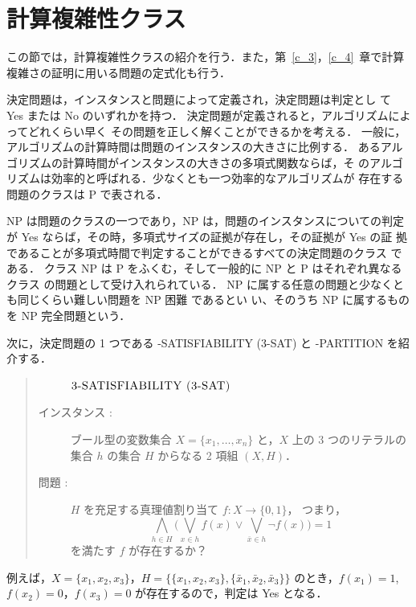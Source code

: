\documentclass[12pt]{optlab-bachelor}
\begin{document}
\section{計算複雑性クラス}
この節では，計算複雑性クラスの紹介を行う．また，第~\ref{c_3}，\ref{c_4}~章で計算複雑さの証明に用いる問題の定式化も行う．

決定問題は，インスタンスと問題によって定義され，決定問題は判定とし
て Yes または No のいずれかを持つ．
決定問題が定義されると，アルゴリズムによってどれくらい早く
その問題を正しく解くことができるかを考える．
一般に，アルゴリズムの計算時間は問題のインスタンスの大きさに比例する．
あるアルゴリズムの計算時間がインスタンスの大きさの多項式関数ならば，そ
のアルゴリズムは効率的と呼ばれる．少なくとも一つ効率的なアルゴリズムが
存在する問題のクラスは P で表される．

NP は問題のクラスの一つであり，NP は，問題のインスタンスについての判定
が Yes ならば，その時，多項式サイズの証拠が存在し，その証拠が Yes の証
拠であることが多項式時間で判定することができるすべての決定問題のクラス
である．
クラス NP は P をふくむ，そして一般的に NP と P はそれぞれ異なるクラス
の問題として受け入れられている．
NP に属する任意の問題と少なくとも同じくらい難しい問題を NP 困難 であるとい
い、そのうち NP に属するものを NP 完全問題という．

次に，決定問題の 1 つである {-SATISFIABILITY (3-SAT)} と {-PARTITION} を紹介する．

\begin{quote}
  \begin{description}
    \item[] ${\mbox {\bf {\sc 3-SATISFIABILITY (3-SAT)}}}$
    \item[インスタンス : ] ブール型の変数集合 $X = \{x_1,\ldots,x_n\}$ と，$X$ 上の 3 つのリテラルの集合 $h$ の集合 $H$ からなる 2 項組 $(X,H)$．
    \item[問題 : ] $H$ を充足する真理値割り当て $f : X \to \{0,1\}$，
    つまり，
    \begin{displaymath}
      \displaystyle \bigwedge_{h \in H} \bigg(\bigvee_{x \in h}f(x) \lor
      \bigvee_{\bar x \in h}\lnot f(x) \bigg) = 1
    \end{displaymath}
    を満たす $f$ が存在するか？
  \end{description}
\end{quote}

例えば，$X = \{x_1, x_2, x_3\}$，$H = \{\{x_1, x_2,  x_3\}, \{\bar x_1, \bar x_2, \bar x_3\}\}$ のとき，$f(x_1) = 1$, $f(x_2) = 0$，$f(x_3) = 0$ が存在するので，判定は Yes となる．
\end{document}
